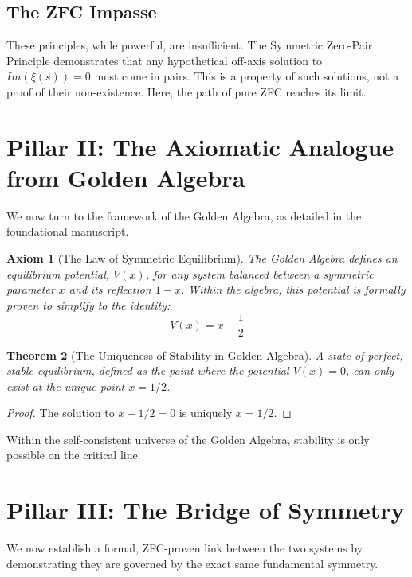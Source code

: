 \documentclass{article}
\newtheorem{theorem}{Theorem}[section]
\newtheorem{axiom}[theorem]{Axiom}
\begin{document}
\subsection*{The ZFC Impasse}
These principles, while powerful, are insufficient. The Symmetric Zero-Pair Principle demonstrates that any hypothetical off-axis solution to $Im(\xi(s))=0$ must come in pairs. This is a property of such solutions, not a proof of their non-existence. Here, the path of pure ZFC reaches its limit.

\section{Pillar II: The Axiomatic Analogue from Golden Algebra}
We now turn to the framework of the Golden Algebra, as detailed in the foundational manuscript.

\begin{axiom}[The Law of Symmetric Equilibrium]
The Golden Algebra defines an equilibrium potential, $V(x)$, for any system balanced between a symmetric parameter $x$ and its reflection $1-x$. Within the algebra, this potential is formally proven to simplify to the identity:
$$ V(x) = x - \frac{1}{2} $$
\end{axiom}

\begin{theorem}[The Uniqueness of Stability in Golden Algebra]
A state of perfect, stable equilibrium, defined as the point where the potential $V(x)=0$, can only exist at the unique point $x = 1/2$.
\end{theorem}
\begin{proof}
The solution to $x - 1/2 = 0$ is uniquely $x=1/2$.
\end{proof}
Within the self-consistent universe of the Golden Algebra, stability is only possible on the critical line.

\section{Pillar III: The Bridge of Symmetry}
We now establish a formal, ZFC-proven link between the two systems by demonstrating they are governed by the exact same fundamental symmetry.
\end{document}
